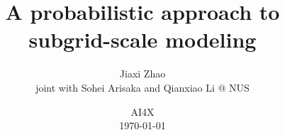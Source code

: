 \documentclass[aspectratio=169]{beamer}
\title[Probabilistic SGS modeling]{A probabilistic approach to 
		subgrid-scale modeling}
\author[J. Zhao]{Jiaxi Zhao \\ \small joint with Sohei Arisaka and Qianxiao Li @ NUS}
\date[\today]{AI4X \\ \today}
\begin{document}
\par \setlength{\parindent}{2em}

\begin{frame}
\titlepage
\end{frame}





	



\end{document}
